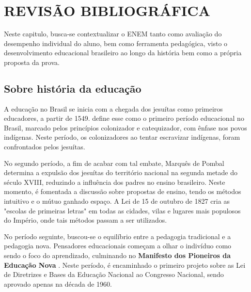 \chapter{REVISÃO BIBLIOGRÁFICA}

	Neste capitulo, busca-se contextualizar o ENEM tanto como avaliação do desempenho individual do aluno, bem como ferramenta pedagógica, visto o desenvolvimento educacional brasileiro ao longo da história bem como a própria proposta da prova.

\section{Sobre história da educação}

	A educação no Brasil se inicia com a chegada dos jesuítas como primeiros educadores, a partir de 1549.  define esse como o primeiro período educacional no Brasil, marcado pelos princípios colonizador e catequizador, com ênfase nos povos indígenas. Neste período, os colonizadores ao tentar escravizar indígenas, foram confrontados pelos jesuítas.

	No segundo período, a fim de acabar com tal embate, Marquês de Pombal determina a expulsão dos jesuítas do território nacional na segunda metade do século XVIII, reduzindo a influência dos padres no ensino brasileiro. Neste momento, é fomentada a discussão sobre propostas de ensino, tendo os métodos intuitivo e o mútuo ganhado espaço. A Lei de 15 de outubro de 1827 cria as "escolas de primeiras letras" em todas as cidades, vilas e lugares mais populosos do Império, onde tais métodos passam a ser utilizados.

	No período seguinte, buscou-se o equilíbrio entre a pedagogia tradicional e a pedagogia nova. Pensadores educacionais começam a olhar o indivíduo como sendo o foco do aprendizado, culminando no \textbf{Manifesto dos Pioneiros da Educação Nova} . Neste período, é encaminhado o primeiro projeto sobre as Lei de Diretrizes e Bases da Educação Nacional ao Congresso Nacional, sendo aprovado apenas na década de 1960.

